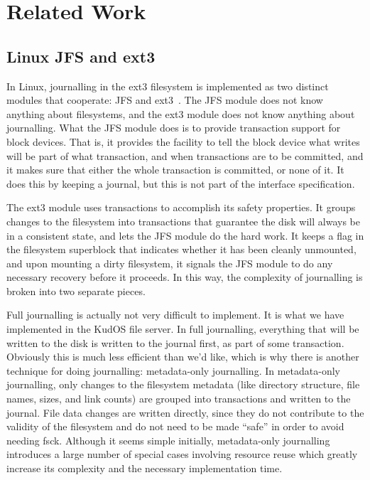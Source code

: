 \section{Related Work}
\label{sec:related}

\subsection{Linux JFS and ext3}

In Linux, journalling in the ext3 filesystem is implemented as two distinct
modules that cooperate: JFS and ext3~\cite{tweedie98journaling}. The JFS module
does not know anything about filesystems, and the ext3 module does not know
anything about journalling. What the JFS module does is to provide transaction
support for block devices. That is, it provides the facility to tell the block
device what writes will be part of what transaction, and when transactions are
to be committed, and it makes sure that either the whole transaction is
committed, or none of it. It does this by keeping a journal, but this is not
part of the interface specification.

The ext3 module uses transactions to accomplish its safety properties. It groups
changes to the filesystem into transactions that guarantee the disk will always
be in a consistent state, and lets the JFS module do the hard work. It keeps a
flag in the filesystem superblock that indicates whether it has been cleanly
unmounted, and upon mounting a dirty filesystem, it signals the JFS module to do
any necessary recovery before it proceeds. In this way, the complexity of
journalling is broken into two separate pieces.

Full journalling is actually not very difficult to implement. It is what we have
implemented in the KudOS file server. In full journalling, everything that will
be written to the disk is written to the journal first, as part of some
transaction. Obviously this is much less efficient than we'd like, which is why
there is another technique for doing journalling: metadata-only journalling. In
metadata-only journalling, only changes to the filesystem metadata (like
directory structure, file names, sizes, and link counts) are grouped into
transactions and written to the journal. File data changes are written directly,
since they do not contribute to the validity of the filesystem and do not need
to be made ``safe'' in order to avoid needing fsck. Although it seems simple
initially, metadata-only journalling introduces a large number of special cases
involving resource reuse which greatly increase its complexity and the necessary
implementation time.

